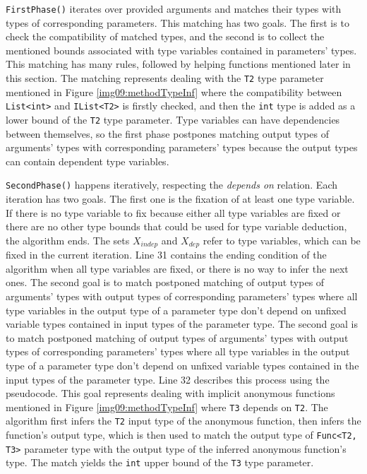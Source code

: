 \par
\texttt{FirstPhase()} iterates over provided arguments and matches their types with types of corresponding parameters. 
This matching has two goals. 
The first is to check the compatibility of matched types, and the second is to collect the mentioned bounds associated with type variables contained in parameters’ types. 
This matching has many rules, followed by helping functions mentioned later in this section.
The matching represents dealing with the \texttt{T2} type parameter mentioned in Figure \ref{img09:methodTypeInf} where the compatibility between \texttt{List<int>} and \texttt{IList<T2>} is firstly checked, and then the \texttt{int} type is added as a lower bound of the \texttt{T2} type parameter. 
Type variables can have dependencies between themselves, so the first phase postpones matching output types of arguments’ types with corresponding parameters’ types because the output types can contain dependent type variables.
\par
\texttt{SecondPhase()} happens iteratively, respecting the \textit{depends on} relation.
Each iteration has two goals.
The first one is the fixation of at least one type variable.
If there is no type variable to fix because either all type variables are fixed or there are no other type bounds that could be used for type variable deduction, the algorithm ends.
The sets \texttt{$X_{indep}$} and \texttt{$X_{dep}$} refer to type variables, which can be fixed in the current iteration.
Line 31 contains the ending condition of the algorithm when all type variables are fixed, or there is no way to infer the next ones.
The second goal is to match postponed matching of output types of arguments' types with output types of corresponding parameters' types where all type variables in the output type of a parameter type don't depend on unfixed variable types contained in input types of the parameter type.
The second goal is to match postponed matching of output types of arguments' types with output types of corresponding parameters' types where all type variables in the output type of a parameter type don't depend on unfixed variable types contained in the input types of the parameter type.
Line 32 describes this process using the pseudocode.
This goal represents dealing with implicit anonymous functions mentioned in Figure \ref{img09:methodTypeInf} where \texttt{T3} depends on \texttt{T2}.
The algorithm first infers the \texttt{T2} input type of the anonymous function, then infers the function's output type, which is then used to match the output type of \texttt{Func<T2, T3>} parameter type with the output type of the inferred anonymous function's type.
The match yields the \texttt{int} upper bound of the \texttt{T3} type parameter.

